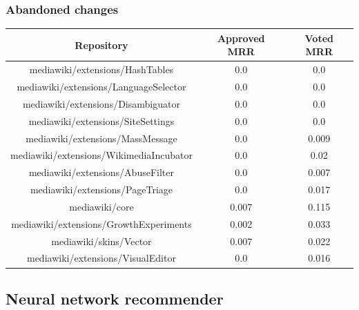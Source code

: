 \subsubsection{Abandoned changes}
\hspace{0.25cm}
\begin{center}
\begin{tabular}{@{}c c c@{}} 
 \hline
    \textbf{Repository} & {Approved MRR} & {Voted MRR} \\
\hline
mediawiki/extensions/HashTables & 0.0 & 0.0 \\
mediawiki/extensions/LanguageSelector & 0.0 & 0.0 \\
mediawiki/extensions/Disambiguator & 0.0 & 0.0 \\
mediawiki/extensions/SiteSettings & 0.0 & 0.0 \\
mediawiki/extensions/MassMessage & 0.0 & 0.009 \\
mediawiki/extensions/WikimediaIncubator & 0.0 & 0.02 \\
mediawiki/extensions/AbuseFilter & 0.0 & 0.007 \\
mediawiki/extensions/PageTriage & 0.0 & 0.017 \\
mediawiki/core & 0.007 & 0.115 \\
mediawiki/extensions/GrowthExperiments & 0.002 & 0.033 \\
mediawiki/skins/Vector & 0.007 & 0.022 \\
mediawiki/extensions/VisualEditor & 0.0 & 0.016 \\
 \hline
\end{tabular}
\end{center}

\subsection{Neural network recommender}

